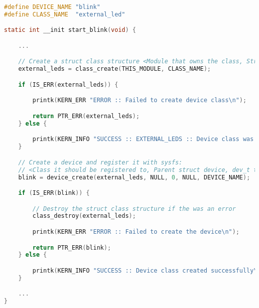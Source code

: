 \documentclass[a4paper,oneside,onecolumn]{article}
\begin{document}
\begin{lstlisting}[language=c, label={lst:device}, caption={Registering Device Class and Object}]
#define DEVICE_NAME "blink"
#define CLASS_NAME  "external_led"

static int __init start_blink(void) {

    ...

    // Create a struct class structure <Module that owns the class, String for the name of the class>
    external_leds = class_create(THIS_MODULE, CLASS_NAME);

    if (IS_ERR(external_leds)) {

        printk(KERN_ERR "ERROR :: Failed to create device class\n");

        return PTR_ERR(external_leds);
    } else {

        printk(KERN_INFO "SUCCESS :: EXTERNAL_LEDS :: Device class was successfully created\n");
    }

    // Create a device and register it with sysfs:
    // <Class it should be registered to, Parent struct device, dev_t to be added, String for device name>
    blink = device_create(external_leds, NULL, 0, NULL, DEVICE_NAME);

    if (IS_ERR(blink)) {

        // Destroy the struct class structure if the was an error
        class_destroy(external_leds);

        printk(KERN_ERR "ERROR :: Failed to create the device\n");

        return PTR_ERR(blink);
    } else {

        printk(KERN_INFO "SUCCESS :: Device class created successfully\n");
    }

    ...
}
\end{lstlisting}
\end{document}
